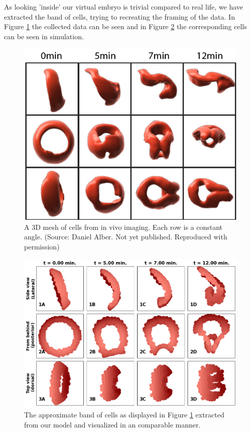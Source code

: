 As looking 'inside' our virtual embryo is trivial compared to real life, we have extracted the band of cells, trying to recreating the framing of the data. In Figure \ref{fig:daniel-cells} the collected data can be seen and in Figure \ref{fig:comparetodaniel} the corresponding cells can be seen in simulation. 
\newpage
\begin{figure}[H]
    \centering
    \includegraphics[width=0.7 \linewidth]{chapters/Results/figures/DanielCut.png}
    \caption{A 3D mesh of cells from in vivo imaging. Each row is a constant angle. (Source: Daniel Alber. Not yet published. Reproduced with permission)}
    \label{fig:daniel-cells}
\end{figure}
\begin{figure}[H]
    \centering
    \includegraphics[width=0.8\linewidth]{chapters/Results/figures/CompareToDaniel.png}
    \caption{The approximate band of cells as displayed in Figure \ref{fig:daniel-cells} extracted from our model and visualized in an comparable manner.}
    \label{fig:comparetodaniel}
\end{figure}


